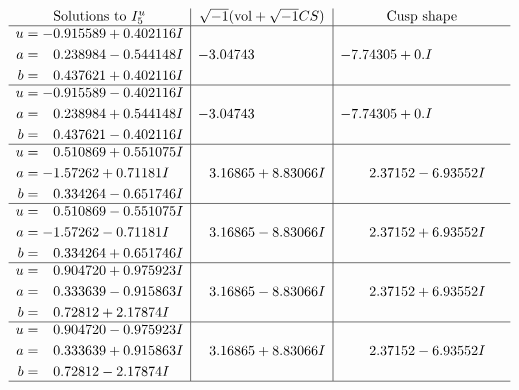 \documentclass[1p]{elsarticle_modified}
\theoremstyle{definition}
\newcommand{\I}{\sqrt{-1}}
\begin{document}
$$\begin{array}{c|c|c}  
\text{Solutions to }I^u_{5}& \I (\text{vol} + \sqrt{-1}CS) & \text{Cusp shape}\\
 \hline 
\begin{aligned}
u &= -0.915589 + 0.402116 I \\
a &= \phantom{-}0.238984 - 0.544148 I \\
b &= \phantom{-}0.437621 + 0.402116 I\end{aligned}
 & -3.04743\phantom{ +0.000000I} & -7.74305 + 0. I\phantom{ +0.000000I} \\ \hline\begin{aligned}
u &= -0.915589 - 0.402116 I \\
a &= \phantom{-}0.238984 + 0.544148 I \\
b &= \phantom{-}0.437621 - 0.402116 I\end{aligned}
 & -3.04743\phantom{ +0.000000I} & -7.74305 + 0. I\phantom{ +0.000000I} \\ \hline\begin{aligned}
u &= \phantom{-}0.510869 + 0.551075 I \\
a &= -1.57262 + 0.71181 I \\
b &= \phantom{-}0.334264 - 0.651746 I\end{aligned}
 & \phantom{-}3.16865 + 8.83066 I & \phantom{-}2.37152 - 6.93552 I \\ \hline\begin{aligned}
u &= \phantom{-}0.510869 - 0.551075 I \\
a &= -1.57262 - 0.71181 I \\
b &= \phantom{-}0.334264 + 0.651746 I\end{aligned}
 & \phantom{-}3.16865 - 8.83066 I & \phantom{-}2.37152 + 6.93552 I \\ \hline\begin{aligned}
u &= \phantom{-}0.904720 + 0.975923 I \\
a &= \phantom{-}0.333639 - 0.915863 I \\
b &= \phantom{-}0.72812 + 2.17874 I\end{aligned}
 & \phantom{-}3.16865 - 8.83066 I & \phantom{-}2.37152 + 6.93552 I \\ \hline\begin{aligned}
u &= \phantom{-}0.904720 - 0.975923 I \\
a &= \phantom{-}0.333639 + 0.915863 I \\
b &= \phantom{-}0.72812 - 2.17874 I\end{aligned}
 & \phantom{-}3.16865 + 8.83066 I & \phantom{-}2.37152 - 6.93552 I\\
 \hline 
 \end{array}$$\newpage\newpage\renewcommand{\arraystretch}{1}
\end{document}
